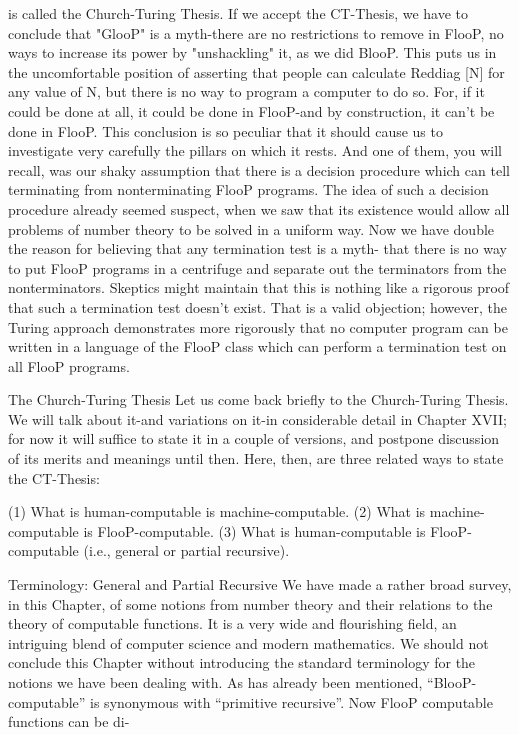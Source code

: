 is called the Church-Turing Thesis. If we accept the CT-Thesis, we have to conclude that
"GlooP" is a myth-there are no restrictions to remove in FlooP, no ways to increase its
power by "unshackling" it, as we did BlooP.
         This puts us in the uncomfortable position of asserting that people can calculate
Reddiag [N] for any value of N, but there is no way to program a computer to do so. For,
if it could be done at all, it could be done in FlooP-and by construction, it can't be done in
FlooP. This conclusion is so peculiar that it should cause us to investigate very carefully
the pillars on which it rests. And one of them, you will recall, was our shaky assumption
that there is a decision procedure which can tell terminating from nonterminating FlooP
programs. The idea of such a decision procedure already seemed suspect, when we saw
that its existence would allow all problems of number theory to be solved in a uniform
way. Now we have double the reason for believing that any termination test is a myth-
that there is no way to put FlooP programs in a centrifuge and separate out the
terminators from the nonterminators.
         Skeptics might maintain that this is nothing like a rigorous proof that such a
termination test doesn't exist. That is a valid objection; however, the Turing approach
demonstrates more rigorously that no computer program can be written in a language of
the FlooP class which can perform a termination test on all FlooP programs.

                             The Church-Turing Thesis
Let us come back briefly to the Church-Turing Thesis. We will talk about it-and
variations on it-in considerable detail in Chapter XVII; for now it will suffice to state it in
a couple of versions, and postpone discussion of its merits and meanings until then. Here,
then, are three related ways to state the CT-Thesis:

   (1) What is human-computable is machine-computable.
   (2) What is machine-computable is FlooP-computable.
   (3) What is human-computable is FlooP-computable
         (i.e., general or partial recursive).

                  Terminology: General and Partial Recursive
We have made a rather broad survey, in this Chapter, of some notions from number
theory and their relations to the theory of computable functions. It is a very wide and
flourishing field, an intriguing blend of computer science and modern mathematics. We
should not conclude this Chapter without introducing the standard terminology for the
notions we have been dealing with.
        As has already been mentioned, “BlooP-computable” is synonymous with
“primitive recursive”. Now FlooP computable functions can be di-




